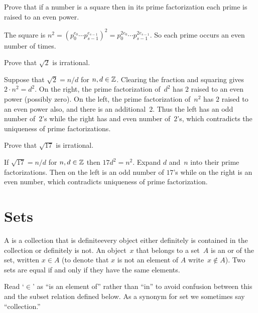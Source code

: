 \documentclass{ibl}  %
\begin{document}
\begin{problem}[\midlength] 
\begin{exes}
\begin{exercise} 
  Prove that if a number is a square then in its prime factorization 
  each prime is raised to an even power.
\end{exercise}
\begin{answer}
  The square is 
  $n^2=(p_0^{e_0}\cdots p_{s-1}^{e_{s-1}})^2=p_0^{2e_0}\cdots p_{s-1}^{2e_{s-1}}$.
  So each prime occurs an even number of times.  
\end{answer}
\begin{exercise} 
  Prove that $\sqrt{2}$ is irrational.
\end{exercise}
\begin{answer}
  Suppose that $\sqrt{2}=n/d$ for $n,d\in\mathbb{Z}$.
  Clearing the fraction and squaring gives $2\cdot n^2=d^2$.
  On the right, the prime factorization of~$d^2$ has $2$ raised to an even 
  power (possibly zero).
  On the left, the prime factorization of~$n^2$ has $2$ raised to an even power
  also, and there is an additional~$2$.
  Thus the left has an odd number of~$2$'s while the right has
  and even number of~$2$'s, which
  contradicts the uniqueness of prime factorizations.   
\end{answer}
\begin{exercise}[\maxlength] 
  Prove that $\sqrt{17}$ is irrational. %
\end{exercise}
\begin{answer}
  If $\sqrt{17}=n/d$ for $n,d\in\mathbb{Z}$ then $17d^2=n^2$.
  Expand $d$ and~$n$ into their prime factorizations.
  Then on the left is an odd number of $17$'s while on the right
  is an even number, which contradicts uniqueness of 
  prime factorization. 
\end{answer}
\end{exes}
\end{problem}










\chapter{Sets}
\begin{df}
A  is a collection that is definite\Dash every 
object either
definitely is contained in the collection or definitely is not.
An object~$x$ that belongs to a set~$A$ is an 
or 
of the set, written $x\in A$
(to denote that $x$ is not an element of $A$ write~$x\notin A$).
Two sets are equal if and only if they have the same elements.
\end{df}
\noindent Read `$\in$' as ``is an element of'' rather than ``in'' to avoid
confusion between this and
the subset relation defined below.
As a synonym for set we sometimes say ``collection.''
\end{document}
